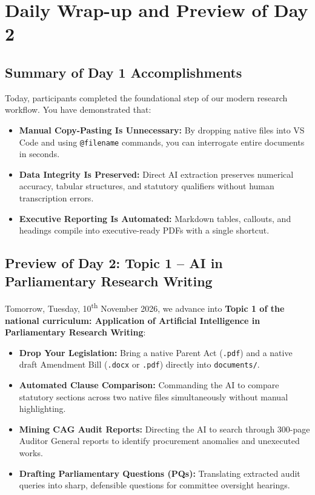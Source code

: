 \documentclass[11pt, a4paper]{report}
\begin{document}
\chapter{Daily Wrap-up and Preview of Day 2}

\section{Summary of Day 1 Accomplishments}
Today, participants completed the foundational step of our modern research workflow. You have demonstrated that:
\begin{itemize}[label=-]
    \item \textbf{Manual Copy-Pasting Is Unnecessary:} By dropping native files into VS Code and using \texttt{@filename} commands, you can interrogate entire documents in seconds.
    \item \textbf{Data Integrity Is Preserved:} Direct AI extraction preserves numerical accuracy, tabular structures, and statutory qualifiers without human transcription errors.
    \item \textbf{Executive Reporting Is Automated:} Markdown tables, callouts, and headings compile into executive-ready PDFs with a single shortcut.
\end{itemize}

\section{Preview of Day 2: Topic 1 -- AI in Parliamentary Research Writing}
Tomorrow, Tuesday, 10\textsuperscript{th} November 2026, we advance into \textbf{Topic 1 of the national curriculum: Application of Artificial Intelligence in Parliamentary Research Writing}:
\begin{itemize}[label=-]
    \item \textbf{Drop Your Legislation:} Bring a native Parent Act (\texttt{.pdf}) and a native draft Amendment Bill (\texttt{.docx} or \texttt{.pdf}) directly into \texttt{documents/}.
    \item \textbf{Automated Clause Comparison:} Commanding the AI to compare statutory sections across two native files simultaneously without manual highlighting.
    \item \textbf{Mining CAG Audit Reports:} Directing the AI to search through 300-page Auditor General reports to identify procurement anomalies and unexecuted works.
    \item \textbf{Drafting Parliamentary Questions (PQs):} Translating extracted audit queries into sharp, defensible questions for committee oversight hearings.
\end{itemize}
\end{document}
